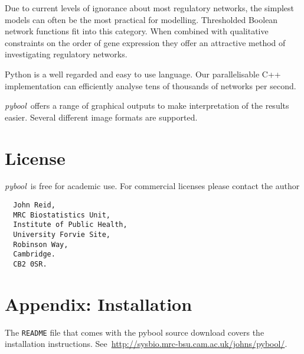 \documentclass{article}
\newcommand{\pybool}{\emph{pybool}}
\begin{document}
Due to current levels of ignorance about most regulatory networks, the simplest models can often be the most practical for modelling. Thresholded Boolean network functions fit into this category. When combined with qualitative constraints on the order of gene expression they offer an attractive method of investigating regulatory networks.

Python is a well regarded and easy to use language. Our parallelisable C++ implementation can efficiently analyse tens of thousands of networks per second.

\pybool\ offers a range of graphical outputs to make interpretation of the results easier. Several different image formats are supported.




\section{License}

\pybool\ is free for academic use. For commercial licenses please contact the author

\begin{verbatim}
  John Reid,
  MRC Biostatistics Unit,
  Institute of Public Health,
  University Forvie Site,
  Robinson Way,
  Cambridge.
  CB2 0SR.
\end{verbatim}



\section{Appendix: Installation}

\label{sec:installation}

The \verb!README! file that comes with the pybool source download covers the installation instructions. See~\url{http://sysbio.mrc-bsu.cam.ac.uk/johns/pybool/}.






\end{document}
